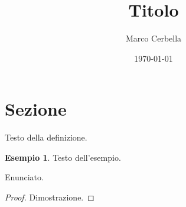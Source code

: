 \documentclass[11pt,a4paper]{article}
\title{Titolo}
\author{Marco Cerbella}
\date{\today}
\theoremstyle{definition}
\newtheorem*{esempio}{Esempio}
\begin{document}
\maketitle

\section{Sezione}

\begin{definizione}
Testo della definizione.
\end{definizione}

\begin{esempio}
Testo dell'esempio.
\end{esempio}

\begin{teorema}
Enunciato.
\end{teorema}

\begin{proof}
Dimostrazione.
\end{proof}
\end{document}
